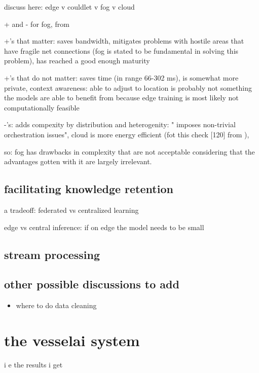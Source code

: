 discuss here: edge v couldlet v fog v cloud

+ and - for fog, from \cite{fogsurvey}

+'s that matter: saves bandwidth, mitigates problems with hostile areas that have fragile net connections (fog is stated to be fundamental in solving this problem), has reached a good enough maturity

+'s that do not matter: saves time (in range 66-302 ms), is somewhat more private, context awareness: able to adjust to location is probably not something the models are able to benefit from because edge training is most likely not computationally feasible

-'s: adds compexity by distribution and heterogenity: " imposes non-trivial orchestration issues", cloud is more energy efficient (fot this check [120] from \cite{fogsurvey}),

so: fog has drawbacks in complexity that are not acceptable considering that the advantages gotten with it are largely irrelevant.

\section{facilitating knowledge retention}

a tradeoff: federated vs centralized learning \cite{iotsurvey}

edge vs central inference: if on edge the model needs to be small \cite{iotsurvey}

\section{stream processing}

\section{other possible discussions to add}

\begin{itemize}
    \item where to do data cleaning
\end{itemize}

\chapter{the vesselai system}

i e the results i get
